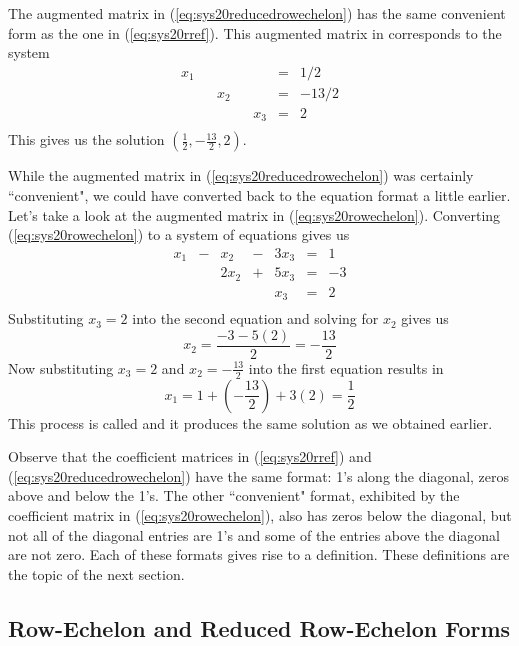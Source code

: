 \documentclass{ximera}
\begin{document}
\begin{exploration}
The augmented matrix in (\ref{eq:sys20reducedrowechelon}) has the same convenient form as the one in (\ref{eq:sys20rref}).  This augmented matrix in corresponds to the system
\begin{equation*}
    \begin{array}{ccccccc}
      x_1 & &&&&= &1/2 \\
   & &x_2&&&=&-13/2\\
   & &&&x_3&=&2\\
        \end{array}
    \end{equation*}
This gives us the solution $(\frac{1}{2}, -\frac{13}{2}, 2)$.

While the augmented matrix in (\ref{eq:sys20reducedrowechelon}) was certainly ``convenient", we could have converted back to the equation format a little earlier.  Let's take a look at the augmented matrix in (\ref{eq:sys20rowechelon}).  Converting (\ref{eq:sys20rowechelon}) to a system of equations gives us
\begin{equation*}
    \begin{array}{ccccccc}
      x_1 &- &x_2&-&3x_3&= &1\\
   & &2x_2&+&5x_3&=&-3\\
   & &&&x_3&=&2\\
        \end{array}
    \end{equation*}
Substituting $x_3=2$ into the second equation and solving for $x_2$ gives us $$x_2=\frac{-3-5(2)}{2}=-\frac{13}{2}$$  Now substituting $x_3=2$ and $x_2=-\frac{13}{2}$ into the first equation results in $$x_1=1+\left(-\frac{13}{2}\right)+3(2)=\frac{1}{2}$$  This process is called  and it produces the same solution as we obtained earlier.
\end{exploration}

Observe that the coefficient matrices in (\ref{eq:sys20rref}) and (\ref{eq:sys20reducedrowechelon}) have the same format: 1's along the diagonal, zeros above and below the 1's.  The other ``convenient" format, exhibited by the coefficient matrix in (\ref{eq:sys20rowechelon}),  also has zeros below the diagonal, but not all of the diagonal entries are 1's and some of the entries above the diagonal are not zero.  Each of these formats gives rise to a definition.  These definitions are the topic of the next section.


\subsection*{Row-Echelon and Reduced Row-Echelon Forms}
\end{document}
